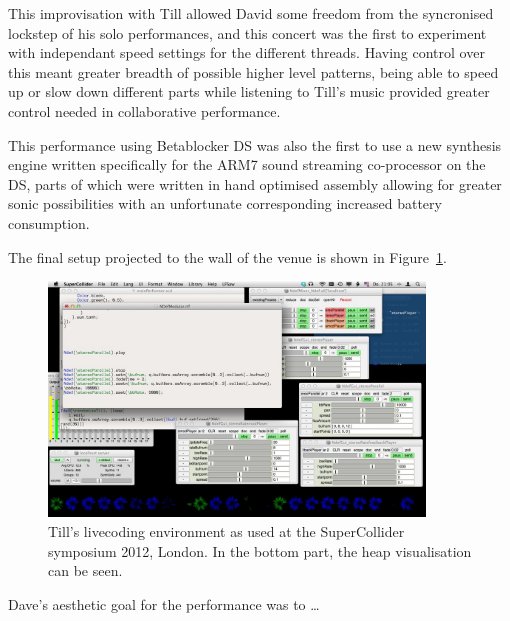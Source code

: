 \documentclass[letterpaper, 12pt]{article}
\begin{document}
This improvisation with Till allowed David some freedom from the syncronised lockstep of his solo performances, and this concert was the first to experiment with independant speed settings for the different threads. Having control over this meant greater breadth of possible higher level patterns, being able to speed up or slow down different parts while listening to Till's music provided greater control needed in collaborative performance. 

This performance using Betablocker DS was also the first to use a new synthesis engine written specifically for the ARM7 sound streaming co-processor on the DS, parts of which were written in hand optimised assembly allowing for greater sonic possibilities with an unfortunate corresponding increased battery consumption. 

The final setup projected to the wall of the venue is shown in Figure~\ref{fig:fig_2012-SuperColliderSymposiumLiveCodingEnvironment-till}.


\begin{figure}
	\centering
		\includegraphics[width=10cm]{2012-SuperColliderSymposiumLiveCodingEnvironment-till}
	\caption{Till's livecoding environment as used at the SuperCollider symposium 2012, London. In the bottom part, the heap visualisation can be seen.}
	\label{fig:fig_2012-SuperColliderSymposiumLiveCodingEnvironment-till}
\end{figure}



Dave's aesthetic goal for the performance was to \dots
\end{document}
